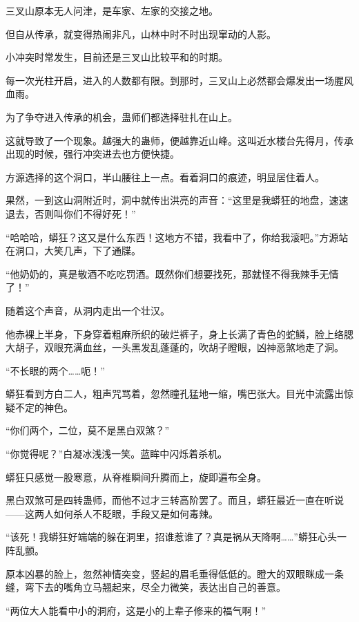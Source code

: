 
\begin{this_body}



三叉山原本无人问津，是车家、左家的交接之地。

但自从传承，就变得热闹非凡，山林中时不时出现窜动的人影。

小冲突时常发生，目前还是三叉山比较平和的时期。

每一次光柱开启，进入的人数都有限。到那时，三叉山上必然都会爆发出一场腥风血雨。

为了争夺进入传承的机会，蛊师们都选择驻扎在山上。

这就导致了一个现象。越强大的蛊师，便越靠近山峰。这叫近水楼台先得月，传承出现的时候，强行冲突进去也方便快捷。

方源选择的这个洞口，半山腰往上一点。看着洞口的痕迹，明显居住着人。

果然，一到这山洞附近时，洞中就传出洪亮的声音：“这里是我蟒狂的地盘，速速退去，否则叫你们不得好死！”

“哈哈哈，蟒狂？这又是什么东西！这地方不错，我看中了，你给我滚吧。”方源站在洞口，大笑几声，下了通牒。

“他奶奶的，真是敬酒不吃吃罚酒。既然你们想要找死，那就怪不得我辣手无情了！”

随着这个声音，从洞内走出一个壮汉。

他赤裸上半身，下身穿着粗麻所织的破烂裤子，身上长满了青色的蛇鳞，脸上络腮大胡子，双眼充满血丝，一头黑发乱蓬蓬的，吹胡子瞪眼，凶神恶煞地走了洞。

“不长眼的两个……呃！”

蟒狂看到方白二人，粗声咒骂着，忽然瞳孔猛地一缩，嘴巴张大。目光中流露出惊疑不定的神色。

“你们两个，二位，莫不是黑白双煞？”

“你觉得呢？”白凝冰浅浅一笑。蓝眸中闪烁着杀机。

蟒狂只感觉一股寒意，从脊椎瞬间升腾而上，旋即遍布全身。

黑白双煞可是四转蛊师，而他不过才三转高阶罢了。而且，蟒狂最近一直在听说——这两人如何杀人不眨眼，手段又是如何毒辣。

“该死！我蟒狂好端端的躲在洞里，招谁惹谁了？真是祸从天降啊……”蟒狂心头一阵乱颤。

原本凶暴的脸上，忽然神情突变，竖起的眉毛垂得低低的。瞪大的双眼眯成一条缝，弯下去的嘴角立马翘起来，尽全力微笑，表达出自己的善意。

“两位大人能看中小的洞府，这是小的上辈子修来的福气啊！”


\end{this_body}
